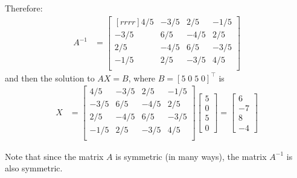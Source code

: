 \begin{example}
Therefore:
%
\begin{align*}
A^{-1} & =
\begin{bmatrix}[rrrr]
4/5  & -3/5 & 2/5 & - 1/5  \\
-3/5 & 6/5 & -4/5 & 2/5 \\
2/5 & -4/5 & 6/5 & -3/5 \\
-1/5 & 2/5 & -3/5 & 4/5 \\
\end{bmatrix}
\end{align*}
and then the solution to $AX=B$, where $B=[5\;0\;5\;0]^{\intercal}$ is
%
\begin{align*}
X & =
\begin{bmatrix}
4/5  & -3/5 & 2/5 & - 1/5  \\
-3/5 & 6/5 & -4/5 & 2/5 \\
2/5 & -4/5 & 6/5 & -3/5 \\
-1/5 & 2/5 & -3/5 & 4/5 \\
\end{bmatrix}
\begin{bmatrix}
5 \\ 0 \\ 5 \\ 0
\end{bmatrix}
= \begin{bmatrix}
6 \\ -7 \\ 8 \\ -4
\end{bmatrix}
\end{align*}

Note that since the matrix $A$ is symmetric (in many ways), the matrix $A^{-1}$ is also symmetric.



\end{example}


